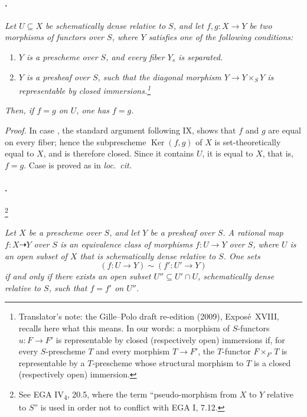 \paragraph{.}
\textit{Let \(U\subseteq X\) be schematically dense relative to \(S\),
and let \(f,g:X\to Y\) be two morphisms of functors over \(S\), where
\(Y\) satisfies one of the following conditions:}

\begin{enumerate}
\item[\SGAInlineRefTarget{sga3:xviii:prop:1.4:item:i}(i)] \textit{\(Y\) is a prescheme over \(S\), and every fiber
  \(Y_s\) is separated.}
\item[\SGAInlineRefTarget{sga3:xviii:prop:1.4:item:ii}(ii)] \textit{\(Y\) is a presheaf over
  \(S\), such that the diagonal morphism
  \(Y\to Y\times_S Y\) is representable by closed
  immersions.\footnote{Translator's note: the Gille--Polo draft re-edition (2009), Exposé~XVIII, recalls
  here what this means. In our words: a morphism of \(S\)-functors \(u\colon F\to F'\) is representable by
  closed (respectively open) immersions if, for every \(S\)-prescheme \(T\) and every morphism
  \(T\to F'\), the \(T\)-functor \(F\times_{F'}T\) is representable by a \(T\)-prescheme whose
  structural morphism to \(T\) is a closed (respectively open) immersion.}}
\end{enumerate}

\textit{Then, if \(f=g\) on \(U\), one has \(f=g\).}

\textit{Proof.}
In case , the standard argument following IX,  shows that
\(f\) and \(g\) are equal on every fiber; hence the subprescheme
\(\operatorname{Ker}(f,g)\) of \(X\) is set-theoretically equal to
\(X\), and is therefore closed. Since it contains \(U\), it is equal
to \(X\), that is, \(f=g\). Case  is proved as in
\textit{loc.\ cit.}

\paragraph{.}
\begingroup
\renewcommand{\thefootnote}{*}
\footnote{See EGA IV\textsubscript{4}, 20.5, where the term
``pseudo-morphism from \(X\) to \(Y\) relative to \(S\)'' is used in
order not to conflict with EGA I, 7.12.}
\addtocounter{footnote}{-1}
\endgroup
\textit{Let \(X\) be a prescheme over \(S\), and let \(Y\) be a
presheaf over \(S\). A \emph{rational map}
\(f:X\dashrightarrow Y\) over \(S\) is an equivalence class of
morphisms \(f:U\to Y\) over \(S\), where \(U\) is an open subset of
\(X\) that is schematically dense relative to \(S\). One sets
\[
  (f:U\to Y)\sim(f':U'\to Y)
\]
if and only if there exists an open subset
\(U''\subseteq U'\cap U\), schematically dense relative to \(S\),
such that \(f=f'\) on \(U''\).}

